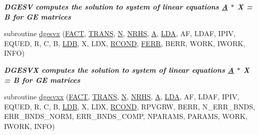 \begin{DoxyCompactItemize}
\begin{DoxyCompactList}\small\item\em {\bfseries  D\+G\+E\+S\+V computes the solution to system of linear equations \hyperlink{classA}{A} $\ast$ X = B for G\+E matrices} \end{DoxyCompactList}\item 
subroutine \hyperlink{group__doubleGEsolve_ga9d90ccf6e340cacd08b7bbbb502ceb21}{dgesvx} (\hyperlink{superlu__enum__consts_8h_af00a42ecad444bbda75cde1b64bd7e72a1b6692b56d378abb85bd49063721d034}{F\+A\+C\+T}, \hyperlink{superlu__enum__consts_8h_a0c4e17b2d5cea33f9991ccc6a6678d62a1f61e3015bfe0f0c2c3fda4c5a0cdf58}{T\+R\+A\+N\+S}, \hyperlink{polmisc_8c_a0240ac851181b84ac374872dc5434ee4}{N}, \hyperlink{example__user_8c_aa0138da002ce2a90360df2f521eb3198}{N\+R\+H\+S}, \hyperlink{classA}{A}, \hyperlink{example__user_8c_ae946da542ce0db94dced19b2ecefd1aa}{L\+D\+A}, A\+F, L\+D\+A\+F, I\+P\+I\+V, E\+Q\+U\+E\+D, R, C, B, \hyperlink{example__user_8c_a50e90a7104df172b5a89a06c47fcca04}{L\+D\+B}, X, L\+D\+X, \hyperlink{superlu__enum__consts_8h_af00a42ecad444bbda75cde1b64bd7e72a9b5c151728d8512307565994c89919d5}{R\+C\+O\+N\+D}, \hyperlink{superlu__enum__consts_8h_af00a42ecad444bbda75cde1b64bd7e72a78fd14d7abebae04095cfbe02928f153}{F\+E\+R\+R}, B\+E\+R\+R, W\+O\+R\+K, I\+W\+O\+R\+K, I\+N\+F\+O)
\begin{DoxyCompactList}\small\item\em {\bfseries  D\+G\+E\+S\+V\+X computes the solution to system of linear equations \hyperlink{classA}{A} $\ast$ X = B for G\+E matrices} \end{DoxyCompactList}\item 
subroutine \hyperlink{group__doubleGEsolve_ga3fed1dc691d07f1e81a049016fe0b67b}{dgesvxx} (\hyperlink{superlu__enum__consts_8h_af00a42ecad444bbda75cde1b64bd7e72a1b6692b56d378abb85bd49063721d034}{F\+A\+C\+T}, \hyperlink{superlu__enum__consts_8h_a0c4e17b2d5cea33f9991ccc6a6678d62a1f61e3015bfe0f0c2c3fda4c5a0cdf58}{T\+R\+A\+N\+S}, \hyperlink{polmisc_8c_a0240ac851181b84ac374872dc5434ee4}{N}, \hyperlink{example__user_8c_aa0138da002ce2a90360df2f521eb3198}{N\+R\+H\+S}, \hyperlink{classA}{A}, \hyperlink{example__user_8c_ae946da542ce0db94dced19b2ecefd1aa}{L\+D\+A}, A\+F, L\+D\+A\+F, I\+P\+I\+V, E\+Q\+U\+E\+D, R, C, B, \hyperlink{example__user_8c_a50e90a7104df172b5a89a06c47fcca04}{L\+D\+B}, X, L\+D\+X, \hyperlink{superlu__enum__consts_8h_af00a42ecad444bbda75cde1b64bd7e72a9b5c151728d8512307565994c89919d5}{R\+C\+O\+N\+D}, R\+P\+V\+G\+R\+W, B\+E\+R\+R, N\+\_\+\+E\+R\+R\+\_\+\+B\+N\+D\+S, E\+R\+R\+\_\+\+B\+N\+D\+S\+\_\+\+N\+O\+R\+M, E\+R\+R\+\_\+\+B\+N\+D\+S\+\_\+\+C\+O\+M\+P, N\+P\+A\+R\+A\+M\+S, P\+A\+R\+A\+M\+S, W\+O\+R\+K, I\+W\+O\+R\+K, I\+N\+F\+O)

\end{DoxyCompactItemize}
